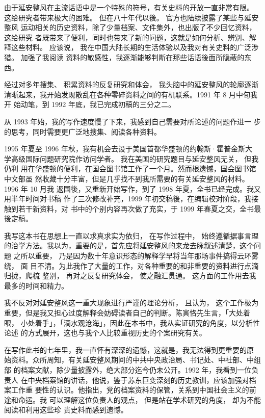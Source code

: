 \begin{preface}
由于延安整风在主流话语中是一个特殊的符号，有关史料的开放一直非常有限。
这给研究者带来极大的困难。
但在八十年代以後。
官方也陆续披露了某些与延安整风
运动相关的历史资料，除了少量档案、文件集外，也出版了不少回忆资料，这给研究
者既带来了便利，同时也带来了新的问题，这就是如何分析、辨别、解释这些材料。
应该说，
我在中国大陆长期的生活体验以及我对有关史料的广泛涉猎。
加强了我阅读
资料的敏感性，我逐渐能够判断在那些话语後面所隐蔽的东西。

经过对多年搜集、
积累资料的反复研究和体会，
我头脑中的延安整风的轮廓逐渐
清晰起来，我开始发现散乱在各种零碎资料之间的有机联系。1991 年 8 月中旬我开
始动笔，到 1992 年底，我已完成初稿的三分之二。

从 1993 年始，我的写作速度慢了下来，我感到自己需要对所论述的问题作进一
步的思考，同时需要更广泛地搜集、阅读各种资料。

1995 年夏至 1996 年秋，我有机会去设于美国首都华盛顿的约翰斯·霍普金斯大
学高级国际问题研究院作访问学者。
我在美国的研究题目与延安整风无关，
但我仍利
用在华盛顿的便利，在国会图书馆工作了一个月。然而根遗憾，国会图书馆中文部虽
然收藏十分丰富，但是几乎找不到我所需要的有关延安整风的材料。1996 年 10 月我
返国後，又重新开始写作，到了 1998 年夏，全书已经完成。我又用半年时间对书稿
作了三次修改补充，1999 年初交稿後，在编辑校对阶段，我接触到若干新资料，对
书中的个别内容再次做了充实，于 1999 年春夏之交，全书最後定稿。

我写这本书在思想上一直以求真求实为依归，
在写作过程中，
始终遵循据事言理
的治学方法。我以为，重要的是，首先应将延安整风的来龙去脉叙述清楚，这个问题
之所以重要，
乃是因为数十年意识形态的解释学早将当年那场事件搞得云环雾绕，
面
目不清。为此我作了大量的工作，对各种重要的和非重要的资料进行点滴归拢，爬梳
鉴别，
再对之反复研究体会，
使之融汇贯通。
这方面的工作用去我最多的时间和精力。

我不反对对延安整风这一重大现象进行严谨的理论分析，
且认为，
这个工作极为
重要，但是我又担心过度解释会妨碍读者自己的判断。陈寅恪先生言，「大处着眼，
小处着手」，「滴水观沧海」，因此在本书中，我从实证研究的角度，以分析性论述
的方式展开，这也与我个人比较重视历史的个案研究有关。

在写作此书的七年里，我一直怀有深深的遗憾，这就是，我无法得到更重要的原
始资料。众所周知，有关延安整风期间的中共中央政治局、书记处、中社部、中组部
的档案文献，除少量披露外，绝大部分迄今仍未公开。1992 年，我看到一位负责人
在中央档案馆的讲话，他说，鉴于苏东巨变深刻的历史教训，应该加强对档案工作重
要性的认识。他指出，党的档案资料的保管，关系到中国社会主义的前途和命运。我
可以理解这位负责人的观点，
但是站在学术研究的角度，
却为不能阅读和利用这些珍
贵史料而感到遗憾。


\end{preface}
